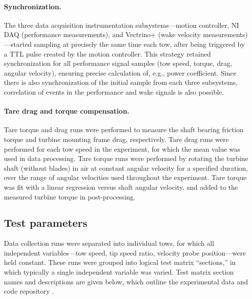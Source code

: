 \documentclass[10pt,letterpaper]{article}
\begin{document}
\paragraph{Synchronization.} The three data acquisition instrumentation
subsystems---motion controller, NI DAQ (performance measurements), and Vectrino+
(wake velocity measurements)---started sampling at precisely the same time each
tow, after being triggered by a TTL pulse created by the motion controller. This
strategy retained synchronization for all performance signal samples (tow speed,
torque, drag, angular velocity), ensuring precise calculation of, e.g., power
coefficient. Since there is also synchronization of the initial sample from each
three subsystems, correlation of events in the performance and wake signals is
also possible.

\paragraph{Tare drag and torque compensation.} Tare torque and drag runs were
performed to measure the shaft bearing friction torque and turbine mounting
frame drag, respectively. Tare drag runs were performed for each tow speed in
the experiment, for which the mean value was used in data processing. Tare
torque runs were performed by rotating the turbine shaft (without blades) in air
at constant angular velocity for a specified duration, over the range of angular
velocities used throughout the experiment. Tare torque was fit with a linear
regression versus shaft angular velocity, and added to the measured turbine
torque in post-processing.


\subsection*{Test parameters}

Data collection runs were separated into individual tows, for which all
independent variables---tow speed, tip speed ratio, velocity probe
position---were held constant. These runs were grouped into logical test matrix
``sections,'' in which typically a single independent variable was varied. Test
matrix section names and descriptions are given below, which outline the
experimental data and code repository \cite{Bachant2015-RM2-data}.
\end{document}
